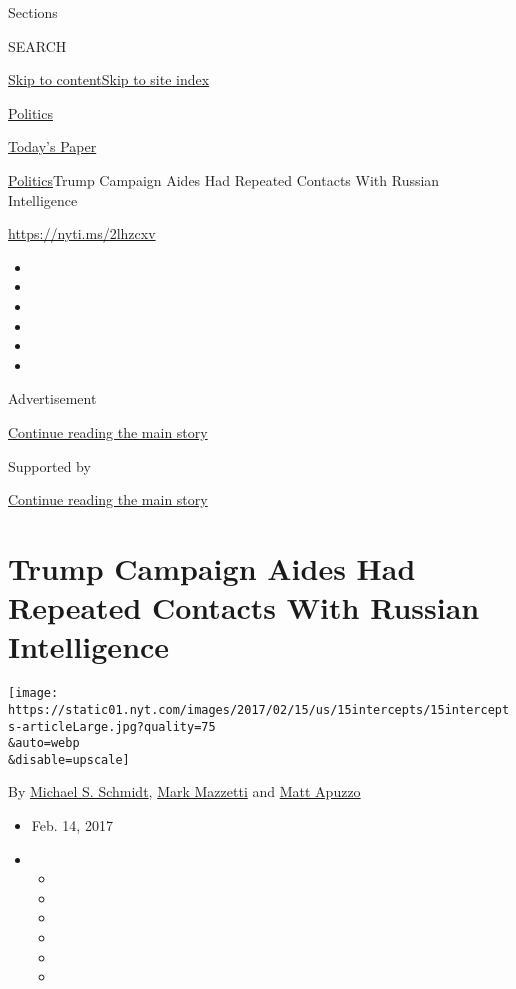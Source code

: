 Sections

SEARCH

\protect\hyperlink{site-content}{Skip to
content}\protect\hyperlink{site-index}{Skip to site index}

\href{https://www.nytimes.com/section/politics}{Politics}

\href{https://myaccount.nytimes.com/auth/login?response_type=cookie\&client_id=vi}{}

\href{https://www.nytimes.com/section/todayspaper}{Today's Paper}

\href{/section/politics}{Politics}\textbar{}Trump Campaign Aides Had
Repeated Contacts With Russian Intelligence

\url{https://nyti.ms/2lhzcxv}

\begin{itemize}
\item
\item
\item
\item
\item
\item
\end{itemize}

Advertisement

\protect\hyperlink{after-top}{Continue reading the main story}

Supported by

\protect\hyperlink{after-sponsor}{Continue reading the main story}

\hypertarget{trump-campaign-aides-had-repeated-contacts-with-russian-intelligence}{%
\section{Trump Campaign Aides Had Repeated Contacts With Russian
Intelligence}\label{trump-campaign-aides-had-repeated-contacts-with-russian-intelligence}}

\texttt{[image: https://static01.nyt.com/images/2017/02/15/us/15intercepts/15intercepts-articleLarge.jpg?quality=75\\\&auto=webp\\\&disable=upscale]}

By \href{http://www.nytimes.com/by/michael-s-schmidt}{Michael S.
Schmidt}, \href{http://www.nytimes.com/by/mark-mazzetti}{Mark Mazzetti}
and \href{http://www.nytimes.com/by/matt-apuzzo}{Matt Apuzzo}

\begin{itemize}
\item
  Feb. 14, 2017
\item
  \begin{itemize}
  \item
  \item
  \item
  \item
  \item
  \item
  \end{itemize}
\end{itemize}

